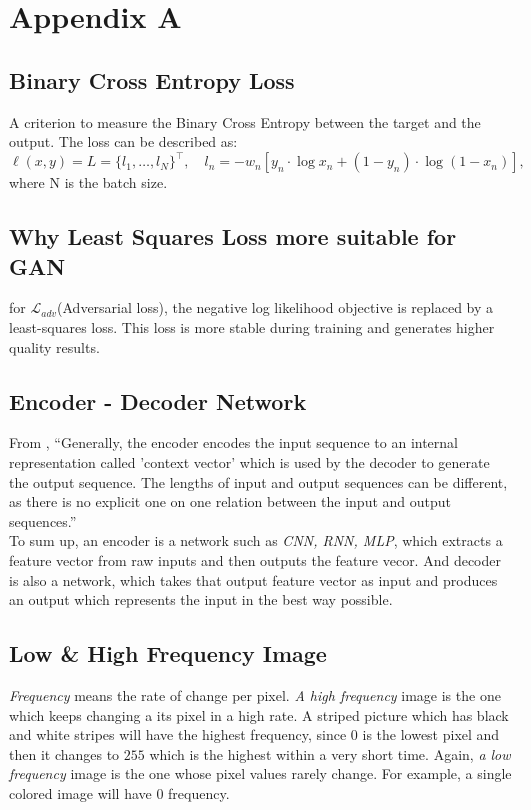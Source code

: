 \chapter{Appendix A}
\begin{appendices}

\section{Binary Cross Entropy Loss}
\label{appendix:BCE}
A criterion to measure the Binary Cross Entropy between the target and the output. The loss can be described as:\\
    $\ell(x, y) = L = \{l_1,\dots,l_N\}^\top, \quad
l_n = - w_n \left[ y_n \cdot \log x_n + (1 - y_n) \cdot \log (1 - x_n) \right],$\\
where N is the batch size.

\section{Why Least Squares Loss more suitable for GAN}
\label{appendix:L2}
for $\mathcal{L}_{adv}$(Adversarial loss), the negative log likelihood objective is replaced by a least-squares loss. This loss is more stable during training and generates higher quality results.

\section{Encoder - Decoder Network}
\label{appendix:En-Dec}
From \cite{BibEntry2018Nov}, 
“Generally, the encoder encodes the input sequence to an internal representation called 'context vector' which is used by the decoder to generate the output sequence. The lengths of input and output sequences can be different, as there is no explicit one on one relation between the input and output sequences.”
\\
To sum up, an encoder is a network such as \textit{CNN, RNN, MLP}, which extracts a feature vector from raw inputs and then outputs the feature vecor. And decoder is also a network, which takes that output feature vector as input and produces an output which represents the input in the best way possible.
\section{Low \& High Frequency Image}
\label{appendix:freq}
\textit{Frequency} means the rate of change per pixel. \textit{A high frequency} image is the one which keeps changing a its pixel in a high rate. A striped picture which has black and white stripes will have the highest frequency, since $0$ is the lowest pixel and then it changes to $255$ which is the highest within a very short time. Again, \textit{a low frequency} image is the one whose pixel values rarely change. For example, a single colored image will have 0 frequency.

\end{appendices}
